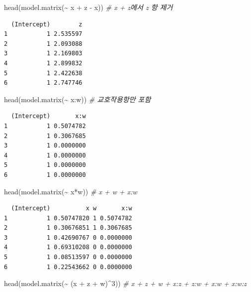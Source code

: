 \documentclass[
  11pt,
]{krantz}
\newenvironment{Shaded}{\begin{snugshade}}{\end{snugshade}}
\newcommand{\CommentTok}[1]{\textcolor[rgb]{0.37,0.37,0.37}{\textit{#1}}}
\newcommand{\DecValTok}[1]{\textcolor[rgb]{0.06,0.06,0.06}{#1}}
\newcommand{\FunctionTok}[1]{\textcolor[rgb]{0,0,0}{#1}}
\newcommand{\NormalTok}[1]{#1}
\newcommand{\SpecialCharTok}[1]{\textcolor[rgb]{0,0,0}{#1}}
\begin{document}
\begin{Shaded}
\begin{Highlighting}[]
\FunctionTok{head}\NormalTok{(}\FunctionTok{model.matrix}\NormalTok{(}\SpecialCharTok{\textasciitilde{}}\NormalTok{ x }\SpecialCharTok{+}\NormalTok{ z }\SpecialCharTok{{-}}\NormalTok{ x)) }\CommentTok{\# x + z에서 z 항 제거}
\end{Highlighting}
\end{Shaded}

\begin{verbatim}
  (Intercept)        z
1           1 2.535597
2           1 2.093088
3           1 2.169803
4           1 2.899832
5           1 2.422638
6           1 2.747746
\end{verbatim}

\begin{Shaded}
\begin{Highlighting}[]
\FunctionTok{head}\NormalTok{(}\FunctionTok{model.matrix}\NormalTok{(}\SpecialCharTok{\textasciitilde{}}\NormalTok{ x}\SpecialCharTok{:}\NormalTok{w)) }\CommentTok{\# 교호작용항만 포함}
\end{Highlighting}
\end{Shaded}

\begin{verbatim}
  (Intercept)       x:w
1           1 0.5074782
2           1 0.3067685
3           1 0.0000000
4           1 0.0000000
5           1 0.0000000
6           1 0.0000000
\end{verbatim}

\begin{Shaded}
\begin{Highlighting}[]
\FunctionTok{head}\NormalTok{(}\FunctionTok{model.matrix}\NormalTok{(}\SpecialCharTok{\textasciitilde{}}\NormalTok{ x}\SpecialCharTok{*}\NormalTok{w)) }\CommentTok{\# x + w + x:w}
\end{Highlighting}
\end{Shaded}

\begin{verbatim}
  (Intercept)          x w       x:w
1           1 0.50747820 1 0.5074782
2           1 0.30676851 1 0.3067685
3           1 0.42690767 0 0.0000000
4           1 0.69310208 0 0.0000000
5           1 0.08513597 0 0.0000000
6           1 0.22543662 0 0.0000000
\end{verbatim}

\begin{Shaded}
\begin{Highlighting}[]
\FunctionTok{head}\NormalTok{(}\FunctionTok{model.matrix}\NormalTok{(}\SpecialCharTok{\textasciitilde{}}\NormalTok{ (x }\SpecialCharTok{+}\NormalTok{ z }\SpecialCharTok{+}\NormalTok{ w)}\SpecialCharTok{\^{}}\DecValTok{3}\NormalTok{)) }\CommentTok{\# x + z + w + x:z + z:w + x:w + x:w:z}
\end{Highlighting}
\end{Shaded}
\end{document}
